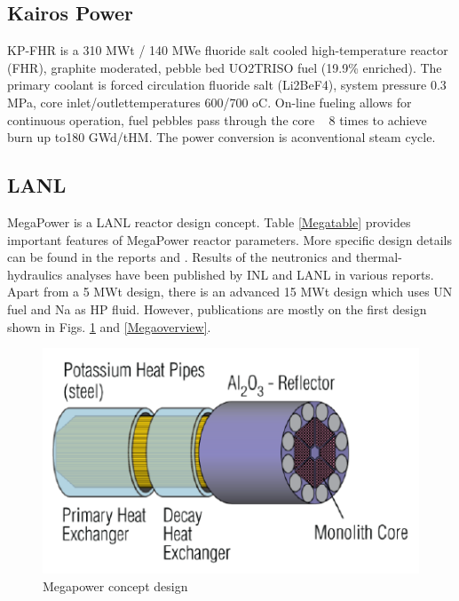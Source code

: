 \subsection{Kairos  Power}
KP-FHR is  a  310  MWt  /  140  MWe  fluoride  salt  cooled  high-temperature  reactor  (FHR),  graphite moderated,  pebble  bed  UO2TRISO  fuel  (19.9\%  enriched). The  primary coolant  is  forced  circulation  fluoride  salt (Li2BeF4), system pressure 0.3 MPa, core inlet/outlettemperatures 600/700 oC. On-line fueling allows for continuous operation, fuel pebbles pass through the core ~ 8 times to achieve burn up to180 GWd/tHM. The power conversion is aconventional steam cycle.

\subsection{LANL}
MegaPower is a LANL reactor design concept. Table \ref{Megatable} provides important features of MegaPower reactor parameters. More specific design details can be found in the reports \cite{sterbentz_special_2017} and \cite{mcclure_design_2015}. Results of the neutronics and thermal-hydraulics analyses have been published by \gls{INL} and LANL in various reports. Apart from a 5 MWt design, there is an advanced 15 MWt design which uses UN fuel and Na as HP fluid. However, publications are mostly on the first design shown in Figs. \ref{Megadesign} and \ref{Megaoverview}. 

\begin{figure}[hbtp]
\centering
\includegraphics[scale=0.8]{Figs/megacore.jpeg}
\caption{Megapower concept design}
\label{Megadesign}
\end{figure}

